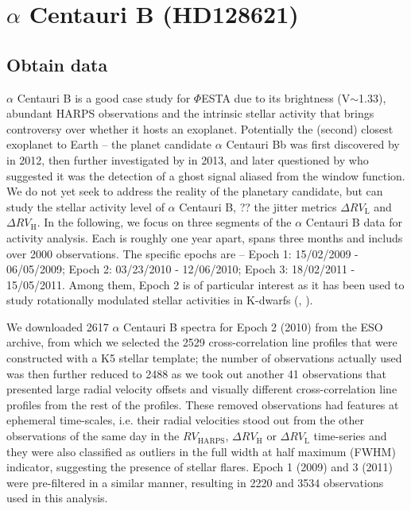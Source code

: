 \section{$\alpha$ Centauri B (HD128621)}
\label{\thesection}

\subsection{Obtain data} 

$\alpha$ Centauri B is a good case study for $\mathit{\Phi}$ESTA due to its brightness (V$\sim$1.33), abundant HARPS observations and the intrinsic stellar activity that brings controversy over whether it hosts an exoplanet. Potentially the (second) closest exoplanet to Earth -- the planet candidate $\alpha$ Centauri Bb was first discovered by \cite{Dumusque_Centauri_B} in 2012, then further investigated by \cite{Hatzes2013} in 2013, and later questioned by \cite{Rajpaul_Alpha_Cen_B} who suggested it was the detection of a ghost signal aliased from the window function. We do not yet seek to address the reality of the planetary candidate, but can study the stellar activity level of $\alpha$ Centauri B, ?? the jitter metrics $\Delta RV_\text{L}$ and $\Delta RV_\text{H}$. In the following, we focus on three segments of the $\alpha$ Centauri B data for activity analysis. Each is roughly one year apart, spans three months and includs over 2000 observations. The specific epochs are -- Epoch 1: 15/02/2009 - 06/05/2009; Epoch 2: 03/23/2010 - 12/06/2010; Epoch 3: 18/02/2011 - 15/05/2011. Among them, Epoch 2 is of particular interest as it has been used to study rotationally modulated stellar activities in K-dwarfs (\cite{Thompson2017MNRAS}, \cite{Wise2018}). 

We downloaded 2617 $\alpha$ Centauri B spectra for Epoch 2 (2010) from the ESO archive, from which we selected the 2529 cross-correlation line profiles that were constructed with a K5 stellar template; the number of observations actually used was then further reduced to 2488 as we took out another 41 observations that presented large radial velocity offsets and visually different cross-correlation line profiles from the rest of the profiles. These removed observations had features at ephemeral time-scales, i.e. their radial velocities stood out from the other observations of the same day in the $RV_\text{HARPS}$, $\Delta RV_\text{H}$ or $\Delta RV_\text{L}$ time-series and they were also classified as outliers in the full width at half maximum (FWHM) indicator, suggesting the presence of stellar flares. Epoch 1 (2009) and 3 (2011) were pre-filtered in a similar manner, resulting in 2220 and 3534 observations used in this analysis.

